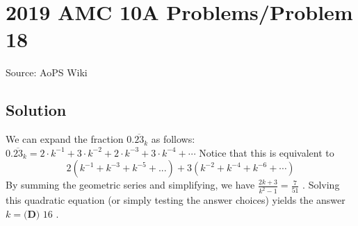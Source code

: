 \documentclass[12pt]{article}
\begin{document}
\section*{{2019 AMC 10A Problems/Problem 18}}
Source: AoPS Wiki

\subsection*{Solution}
We can expand the fraction $0.\overline{23}_k$ as follows: $0.\overline{23}_k = 2\cdot k^{-1} + 3 \cdot k^{-2} + 2 \cdot k^{-3} + 3 \cdot k^{-4} + \cdots$ Notice that this is equivalent to \[2( k^{-1} + k^{-3} + k^{-5} + ... ) + 3 (k^{-2} + k^{-4} + k^{-6} + \cdots )\] By summing the geometric series and simplifying, we have $\frac{2k+3}{k^2-1} = \frac{7}{51}$ . Solving this quadratic equation (or simply testing the answer choices) yields the answer $k = \boxed{\textbf{(D) }16}$ .
\end{document}
